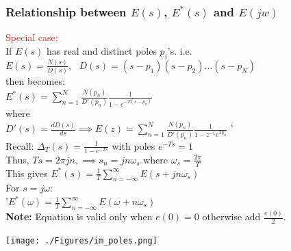 \documentclass[mathserif, 10pt]{beamer} %
\def\1{\raisebox{.5pt}{\textcircled{\raisebox{-.9pt} {1}}}}
\def\2{\raisebox{.5pt}{\textcircled{\raisebox{-.9pt} {2}}}}
\def\3{\raisebox{.5pt}{\textcircled{\raisebox{-.9pt} {3}}}}
\begin{document}
\frame
{

\normalsize

\frametitle{Relationship between $E(s)$, $E^*(s)$ and $E(jw)$}

\vspace{-1in}
\textcolor{red}{Special case:}\\
If $E(s)$ has real and distinct poles $p_i$'s.  i.e.\\
$E(s) = \frac{N(s)}{D(s)}, ~~~D(s) = (s-p_1)(s-p_2) \hdots (s-p_N)$\\
then \1 becomes:\\
\2  $E^*(s) = \sum\limits_{n=1}^N \frac{N(p_n)}{D'(p_n)}\frac{1}{1-e^{-T(s-p_n)}}$\\
where \\
 $D'(s) = \frac{dD(s)}{ds}\implies E(z) = \sum\limits_{n=1}^N \frac{N(p_n)}{D'(p_n)} \frac{1}{1-z^{-1}e^{Tp_n}}$ \2' \\%

Recall: $\Delta_T(s) = \frac{1}{1-e^{-Ts}}$ with poles $e^{-Ts}=1$ \\
Thus, $Ts = 2\pi jn, \implies s_n = j n \omega_s $ where $\omega_s=\frac{2\pi}{T}$ \\
This gives \3  $E^*(s) = \frac{1}{T} \sum\limits_{n=-\infty}^{\infty} E(s+jn\omega_s)$\\
 For $s=j\omega$:\\
\3'$E^*(\omega) = \frac{1}{T}\sum\limits_{n=-\infty}^{\infty} E(\omega +n \omega_s)$\\%
\textbf{Note: }Equation \3 is valid only when $e(0) = 0$
otherwise add $\frac{e(0)}{2}$.

\vspace{-2.1in}
\hspace{3.1in}
\texttt{[image: ./Figures/im\_poles.png]} \vspace{-1in}


}
\end{document}
